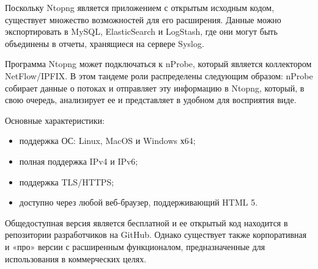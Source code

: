 Поскольку Ntopng является приложением с открытым исходным кодом, существует
множество возможностей для его расширения. Данные можно экспортировать в
MySQL, ElasticSearch и LogStash, где они могут быть объединены в отчеты,
хранящиеся на сервере Syslog.


Программа Ntopng может подключаться к nProbe, который является
коллектором NetFlow/IPFIX. В этом тандеме роли распределены следующим
образом: nProbe собирает данные о потоках и отправляет эту информацию в
Ntopng, который, в свою очередь, анализирует ее и представляет в удобном для
восприятия виде.


Основные характеристики:
\begin{itemize}
    \item поддержка ОС: Linux, MacOS и Windows х64;
    \item полная поддержка IPv4 и IPv6;
    \item поддержка TLS/HTTPS;
    \item доступно через любой веб-браузер, поддерживающий HTML 5.
\end{itemize}

Общедоступная версия является бесплатной и ее открытый код находится в репозитории 
разработчиков на GitHub. Однако существует также корпоративная и «про» версии с 
расширенным функционалом, предназначенные для использования в коммерческих целях.


